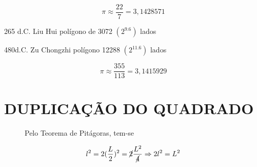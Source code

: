 \documentclass[a4paper, 12pt]{article}
\begin{document}
    \[\pi \approx \frac{22}{7} = 3,1428571\]
    
    {265 d.C. Liu Hui polígono de 3072 $(2^9.6)$ lados} \newline
    
    {480d.C. Zu Chongzhi polígono 12288 $(2^11.6)$ lados}
    
    \[\pi \approx \frac{355}{113} = 3,1415929\]
    
    \newpage
    \section{DUPLICAÇÃO DO QUADRADO}
    \begin{figure} [h!]
        \begin{minipage}[!] {0.4\linewidth}
            \caption{}
        \end{minipage}
        \begin{minipage}[!] {0.4\linewidth}
            {Pelo Teorema de Pitágoras, tem-se}
    
            \[l^2 = 2 (\frac{L}{2})^2 = \cancel{2} \frac{L^2}{\cancel{4}} \Rightarrow 2l^2 = L^2\] \newline
    
        \end{minipage}
    \end{figure} 
\end{document}
